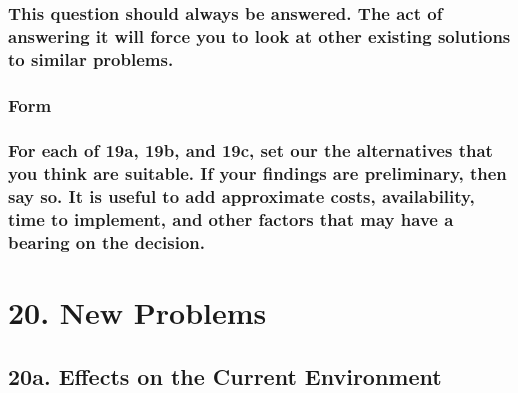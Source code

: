 \documentclass[
]{article}
\begin{document}
\hypertarget{this-question-should-always-be-answered.-the-act-of-answering-it-will-force-you-to-look-at-other-existing-solutions-to-similar-problems.}{%
\subsubsection{\texorpdfstring{This question should always be answered.
The act of answering it will force you to look at other existing
solutions to similar problems.
}{This question should always be answered. The act of answering it will force you to look at other existing solutions to similar problems. }}\label{this-question-should-always-be-answered.-the-act-of-answering-it-will-force-you-to-look-at-other-existing-solutions-to-similar-problems.}}

\hypertarget{form-30}{%
\subsubsection{Form}\label{form-30}}

\hypertarget{for-each-of-19a-19b-and-19c-set-our-the-alternatives-that-you-think-are-suitable.-if-your-findings-are-preliminary-then-say-so.-it-is-useful-to-add-approximate-costs-availability-time-to-implement-and-other-factors-that-may-have-a-bearing-on-the-decision.}{%
\subsubsection{For each of 19a, 19b, and 19c, set our the alternatives
that you think are suitable. If your findings are preliminary, then say
so. It is useful to add approximate costs, availability, time to
implement, and other factors that may have a bearing on the
decision.}\label{for-each-of-19a-19b-and-19c-set-our-the-alternatives-that-you-think-are-suitable.-if-your-findings-are-preliminary-then-say-so.-it-is-useful-to-add-approximate-costs-availability-time-to-implement-and-other-factors-that-may-have-a-bearing-on-the-decision.}}

\hypertarget{new-problems}{%
\section{20. New Problems}\label{new-problems}}

\hypertarget{a.-effects-on-the-current-environment}{%
\subsection{20a. Effects on the Current
Environment}\label{a.-effects-on-the-current-environment}}
\end{document}
